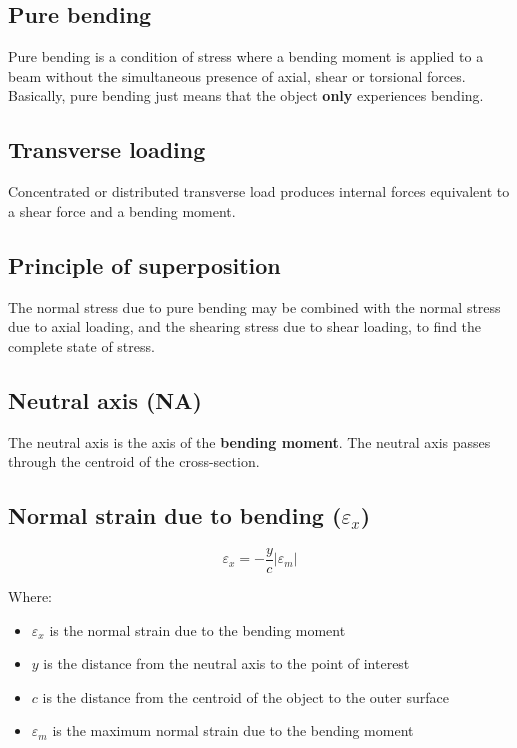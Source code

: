 \documentclass[11pt]{article}
\begin{document}
\subsection{Pure bending}
\label{sec:orgd43de42}
Pure bending is a condition of stress where a bending moment is applied to a beam without the simultaneous presence of axial, shear or torsional forces. Basically, pure bending just means that the object \textbf{only} experiences bending.

\subsection{Transverse loading}
\label{sec:orgd38aeeb}
Concentrated or distributed transverse load produces internal forces equivalent to a shear force and a bending moment.

\subsection{Principle of superposition}
\label{sec:org579c0a5}
The normal stress due to pure bending may be combined with the normal stress due to axial loading, and the shearing stress due to shear loading, to find the complete state of stress.

\subsection{Neutral axis (NA)}
\label{sec:orge52ae33}
The neutral axis is the axis of the \textbf{bending moment}. The neutral axis passes through the centroid of the cross-section.

\subsection{Normal strain due to bending (\(\varepsilon_x\))}
\label{sec:org080737c}
\[\varepsilon_x = - \frac{y}{c} \left| \varepsilon_m \right|\]

Where:
\begin{itemize}
\item \(\varepsilon_x\) is the normal strain due to the bending moment
\item \(y\) is the distance from the neutral axis to the point of interest
\item \(c\) is the distance from the centroid of the object to the outer surface
\item \(\varepsilon_m\) is the maximum normal strain due to the bending moment
\end{itemize}
\end{document}
